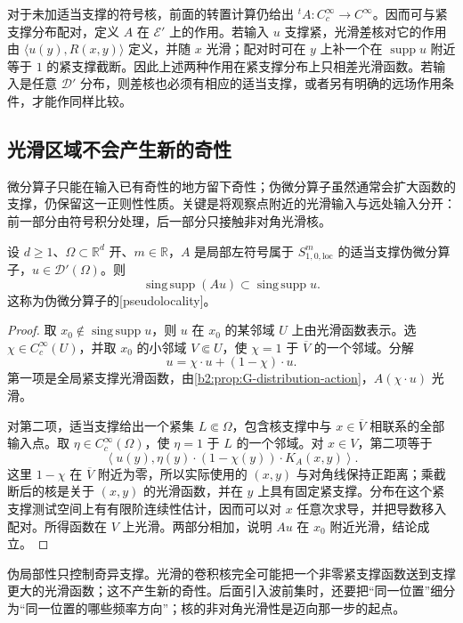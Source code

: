 \ProseParagraphBreak
对于未加适当支撑的符号核，前面的转置计算仍给出 \({}^tA:C_c^\infty\to C^\infty\)。因而可与紧支撑分布配对，定义 \(A\) 在 \(\mathcal E'\) 上的作用。若输入 \(u\) 支撑紧，光滑差核对它的作用由 \(\langle u(y),R(x,y)\rangle\) 定义，并随 \(x\) 光滑；配对时可在 \(y\) 上补一个在 \(\operatorname{supp}u\) 附近等于 \(1\) 的紧支撑截断。因此上述两种作用在紧支撑分布上只相差光滑函数。若输入是任意 \(\mathcal D'\) 分布，则差核也必须有相应的适当支撑，或者另有明确的远场作用条件，才能作同样比较。

\subsection{光滑区域不会产生新的奇性}
\label{b2:subsec:G0203}

微分算子只能在输入已有奇性的地方留下奇性；伪微分算子虽然通常会扩大函数的支撑，仍保留这一正则性性质。关键是将观察点附近的光滑输入与远处输入分开：前一部分由符号积分处理，后一部分只接触非对角光滑核。

\begin{proposition}[伪局部性]
\label{b2:prop:G-pseudolocal}
设 \(d\ge1\)、\(\Omega\subset\mathbb R^d\) 开、\(m\in\mathbb R\)，\(A\) 是局部左符号属于 \(S^m_{1,0,\mathrm{loc}}\) 的适当支撑伪微分算子，\(u\in\mathcal D'(\Omega)\)。则
\[
 \operatorname{sing\,supp}(Au)
 \subset\operatorname{sing\,supp}u.
\]
这称为伪微分算子的[pseudolocality]。
\end{proposition}
\begin{proof}
取 \(x_0\notin\operatorname{sing\,supp}u\)，则 \(u\) 在 \(x_0\) 的某邻域 \(U\) 上由光滑函数表示。选 \(\chi\in C_c^\infty(U)\)，并取 \(x_0\) 的小邻域 \(V\Subset U\)，使 \(\chi=1\) 于 \(\overline V\) 的一个邻域。分解
\[
 u=\chi\cdot u+(1-\chi)\cdot u.
\]
第一项是全局紧支撑光滑函数，由\cref{b2:prop:G-distribution-action}，\(A(\chi\cdot u)\) 光滑。

对第二项，适当支撑给出一个紧集 \(L\Subset\Omega\)，包含核支撑中与 \(x\in\overline V\) 相联系的全部输入点。取 \(\eta\in C_c^\infty(\Omega)\)，使 \(\eta=1\) 于 \(L\) 的一个邻域。对 \(x\in V\)，第二项等于
\[
 \left\langle u(y),\eta(y)\cdot(1-\chi(y))\cdot K_A(x,y)\right\rangle.
\]
这里 \(1-\chi\) 在 \(\overline V\) 附近为零，所以实际使用的 \((x,y)\) 与对角线保持正距离；乘截断后的核是关于 \((x,y)\) 的光滑函数，并在 \(y\) 上具有固定紧支撑。分布在这个紧支撑测试空间上有有限阶连续性估计，因而可以对 \(x\) 任意次求导，并把导数移入配对。所得函数在 \(V\) 上光滑。两部分相加，说明 \(Au\) 在 \(x_0\) 附近光滑，结论成立。
\end{proof}
伪局部性只控制奇异支撑。光滑的卷积核完全可能把一个非零紧支撑函数送到支撑更大的光滑函数；这不产生新的奇性。后面引入波前集时，还要把“同一位置”细分为“同一位置的哪些频率方向”；核的非对角光滑性是迈向那一步的起点。

